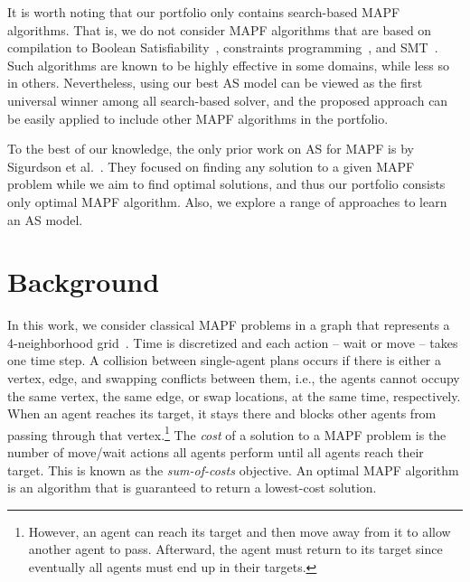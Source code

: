 \documentclass[letterpaper]{article} %
\begin{document}
It is worth noting that our portfolio only contains search-based MAPF algorithms. That is, we do not consider MAPF algorithms that are based on compilation to Boolean Satisfiability~\cite{surynek2016efficient,DBLP:conf/socs/BartakS19}, constraints programming~\cite{DBLP:conf/ictai/BartakZSBS17}, and SMT~\cite{surynek2019unifying,erdem2013general}. Such algorithms are known to be highly effective in some domains, while less so in others. Nevertheless, using our best AS model can be viewed as the first universal winner among all search-based solver, and the proposed approach can be easily applied to include other MAPF algorithms in the portfolio. 



To the best of our knowledge, the only prior work on AS for MAPF is by Sigurdson et al.~. They focused on finding any solution to a given MAPF problem while we aim to find optimal solutions, and thus our portfolio consists only optimal MAPF algorithm. Also, we explore a range of approaches to learn an AS model. 






\section{Background}

In this work, we consider classical MAPF problems in a graph that represents a 4-neighborhood grid~\cite{stern2019multiagent}. 
Time is discretized and each action -- wait or move -- takes one time step. 
A collision between single-agent plans occurs if there is either a vertex, edge, and swapping conflicts between them, i.e., the agents cannot occupy the same vertex, the same edge, or swap locations, at the same time, respectively. 
When an agent reaches its target, it stays there and blocks other agents from passing through that vertex.\footnote{However, an agent can reach its target and then move away from it to allow another agent to pass. Afterward, the agent must return to its target since eventually all agents must end up in their targets.} 
The \emph{cost} of a solution to a MAPF problem is the number of move/wait actions all agents perform until all agents reach their target. This is known as the \emph{sum-of-costs} objective. 
An optimal MAPF algorithm is an algorithm that is guaranteed to return a lowest-cost solution.  
\end{document}
